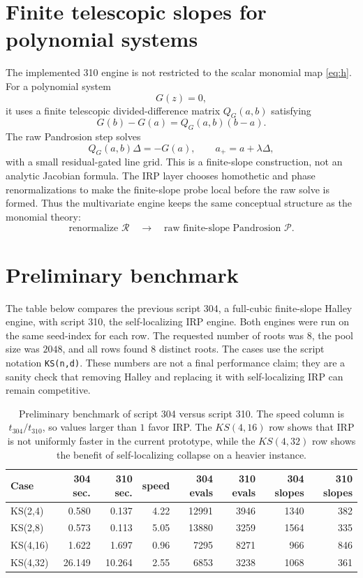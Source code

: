 \documentclass[11pt]{article}
\newcommand{\cR}{\mathcal{R}}
\newcommand{\cP}{\mathcal{P}}
\begin{document}
\section{Finite telescopic slopes for polynomial systems}
The implemented 310 engine is not restricted to the scalar monomial map \eqref{eq:h}.  For a polynomial system
\[
  G(z)=0,
\]
it uses a finite telescopic divided-difference matrix $Q_G(a,b)$ satisfying
\begin{equation}
  G(b)-G(a)=Q_G(a,b)(b-a). \label{eq:telescope}
\end{equation}
The raw Pandrosion step solves
\begin{equation}
  Q_G(a,b)\Delta=-G(a),\qquad a_+=a+\lambda\Delta, \label{eq:raw-system}
\end{equation}
with a small residual-gated line grid.  This is a finite-slope construction, not an analytic Jacobian formula.  The IRP layer chooses homothetic and phase renormalizations to make the finite-slope probe local before the raw solve is formed.  Thus the multivariate engine keeps the same conceptual structure as the monomial theory:
\[
  \boxed{\text{renormalize }\cR\quad\rightarrow\quad\text{raw finite-slope Pandrosion }\cP.}
\]

\section{Preliminary benchmark}
The table below compares the previous script 304, a full-cubic finite-slope Halley engine, with script 310, the self-localizing IRP engine.  Both engines were run on the same seed-index for each row.  The requested number of roots was $8$, the pool size was $2048$, and all rows found $8$ distinct roots.  The cases use the script notation \texttt{KS(n,d)}.  These numbers are not a final performance claim; they are a sanity check that removing Halley and replacing it with self-localizing IRP can remain competitive.

\begin{table}[h]
\centering
\small
\begin{tabular}{lrrrrrrr}
\toprule
Case & 304 sec. & 310 sec. & speed & 304 evals & 310 evals & 304 slopes & 310 slopes\\
\midrule
KS(2,4)  & 0.580 & 0.137 & 4.22 & 12991 & 3946 & 1340 & 382\\
KS(2,8)  & 0.573 & 0.113 & 5.05 & 13880 & 3259 & 1564 & 335\\
KS(4,16) & 1.622 & 1.697 & 0.96 & 7295  & 8271 & 966  & 846\\
KS(4,32) & 26.149 & 10.264 & 2.55 & 6853 & 3238 & 1068 & 361\\
\bottomrule
\end{tabular}
\caption{Preliminary benchmark of script 304 versus script 310.  The speed column is $t_{304}/t_{310}$, so values larger than $1$ favor IRP.  The $KS(4,16)$ row shows that IRP is not uniformly faster in the current prototype, while the $KS(4,32)$ row shows the benefit of self-localizing collapse on a heavier instance.}
\label{tab:bench}
\end{table}
\end{document}
